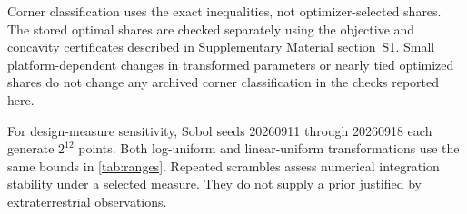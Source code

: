\begin{table}[htbp]
\centering\small
\caption{All-inward inputs out of 1,024, with a conditional price-robustness check. The last column applies a uniform 10\% price reduction to each listed scenario while retaining its other settings. It is computed from the exact boundary, not from a new behavioral assumption or an observational sample.}
\label{tab:scenarios}

\end{table}

Corner classification uses the exact inequalities, not optimizer-selected shares. The stored optimal shares are checked separately using the objective and concavity certificates described in Supplementary Material section~S1. Small platform-dependent changes in transformed parameters or nearly tied optimized shares do not change any archived corner classification in the checks reported here.

For design-measure sensitivity, Sobol seeds 20260911 through 20260918 each generate $2^{12}$ points. Both log-uniform and linear-uniform transformations use the same bounds in \cref{tab:ranges}. Repeated scrambles assess numerical integration stability under a selected measure. They do not supply a prior justified by extraterrestrial observations.

